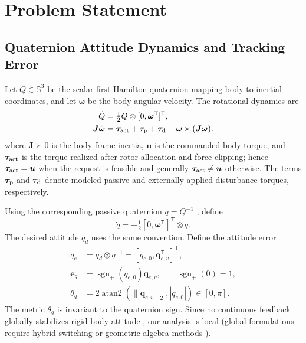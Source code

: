\documentclass[letterpaper, 10 pt, conference]{ieeeconf}
\newcommand{\T}{^{\mathsf T}}
\newcommand{\sgnp}{\operatorname{sgn}_{+}}
\begin{document}
\section{Problem Statement}
\label{sec:problem}

\subsection{Quaternion Attitude Dynamics and Tracking Error}

Let $Q\in\mathbb S^3$ be the scalar-first Hamilton quaternion mapping body to
inertial coordinates, and let $\bm\omega$ be the body angular velocity. The
rotational dynamics are \cite{schaub2018amss}
\begin{align}
 \dot Q&=\tfrac12 Q\otimes[0,\bm\omega\T]\T,\\
 \bm J\dot{\bm\omega}&=\bm\tau_{\rm act}+\bm\tau_{\rm p}
       +\bm\tau_{\rm d}-\bm\omega\times(\bm J\bm\omega).
 \label{eq:plant}
\end{align}
where $\bm J\succ0$ is the body-frame inertia, $\bm u$ is the commanded
body torque, and $\bm\tau_{\rm act}$ is the torque realized after rotor
allocation and force clipping; hence $\bm\tau_{\rm act}=\bm u$ when the
request is feasible and generally $\bm\tau_{\rm act}\neq\bm u$ otherwise.
The terms $\bm\tau_{\rm p}$ and $\bm\tau_{\rm d}$ denote modeled passive and
externally applied disturbance torques, respectively.

Using the corresponding passive quaternion $q=Q^{-1}$ \cite{diebel2006quaternion}, define
\begin{equation}
 \dot q=-\tfrac12[0,\bm\omega\T]\T\otimes q.
 \label{eq:passive}
\end{equation}
The desired attitude $q_d$ uses the same convention. Define the attitude error
\begin{align}
 q_e&=q_d\otimes q^{-1}=[q_{e,0},\bm q_{e,v}\T]\T,\\
 \bm e_q&=\sgnp(q_{e,0})\bm q_{e,v},\qquad \sgnp(0)=1,\\
 \theta_q&=2\operatorname{atan2}(\|\bm q_{e,v}\|_2,|q_{e,0}|)
             \in[0,\pi].
 \label{eq:theta}
\end{align}
The metric $\theta_q$ is invariant to the quaternion sign. Since no continuous feedback globally stabilizes rigid-body attitude \cite{chaturvedi2011rigid}, our analysis is local (global formulations require hybrid switching \cite{mayhew2011hybrid} or geometric-algebra methods \cite{rubioscola2026ga}).
\end{document}
